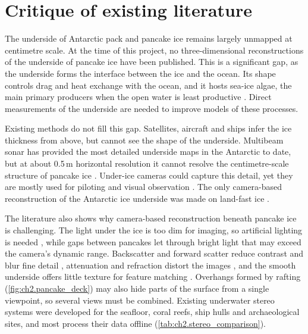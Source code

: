\section{Critique of existing literature}
\label{sec:ch2.critique}
The underside of Antarctic pack and pancake ice remains largely unmapped at centimetre scale.
At the time of this project, no three-dimensional reconstructions of the underside of pancake ice have been published.
This is a significant gap, as the underside forms the interface between the ice and the ocean.
Its shape controls drag and heat exchange with the ocean, and it hosts sea-ice algae,
the main primary producers when the open water is least productive \cite{lizotteContributionsSeaIce2001}.
Direct measurements of the underside are needed to improve models of these processes.

Existing methods do not fill this gap. Satellites, aircraft and ships infer the ice thickness from above, but cannot see the shape of the underside.
Multibeam sonar has provided the most detailed underside maps in the Antarctic to date, but at about 0.5\,m horizontal
resolution it cannot resolve the centimetre-scale structure of pancake ice \cite{williamsThickDeformedAntarctic2015}.
Under-ice cameras could capture this detail, yet they are mostly used for piloting and visual observation
\cite{katleinNewRemotelyOperated2017}. The only camera-based reconstruction of the Antarctic ice underside was made on
land-fast ice \cite{cimoliUnderIceHyperspectralRGB2019}.

The literature also shows why camera-based reconstruction beneath pancake ice is challenging. The light under the ice is
too dim for imaging, so artificial lighting is needed \cite{arndtInfluenceSnowDepth2017,katleinNewRemotelyOperated2017},
while gaps between pancakes let through bright light that may exceed the camera's dynamic range.
Backscatter and forward scatter reduce contrast and blur fine detail
\cite{jaffeComputerModelingDesign1990,treibitzActivePolarizationDescattering2009}, attenuation and refraction distort the
images \cite{akkaynakWhatSpaceAttenuation2017,shortisCalibrationTechniquesAccurate2015}, and the smooth underside offers
little texture for feature matching \cite{langeDevelopmentSeaIce1989,lowe2004}. Overhangs formed by rafting
(\autoref{fig:ch2.pancake_deck}) may also hide parts of the surface from a single viewpoint, so several views must be
combined. Existing underwater stereo systems were developed for the seafloor, coral reefs, ship hulls and archaeological
sites, and most process their data offline (\autoref{tab:ch2.stereo_comparison}).

